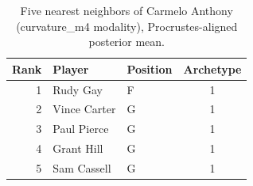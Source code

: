 \begin{table}[htbp]
  \centering\small
  \begin{tabular}{rllc}
    \toprule
    Rank & Player & Position & Archetype \\
    \midrule
    1 & Rudy Gay & F & 1 \\
    2 & Vince Carter & G & 1 \\
    3 & Paul Pierce & G & 1 \\
    4 & Grant Hill & G & 1 \\
    5 & Sam Cassell & G & 1 \\
    \bottomrule
  \end{tabular}
  \caption{Five nearest neighbors of Carmelo Anthony (curvature_m4 modality), Procrustes-aligned posterior mean.}
  \label{tab:Carmelo_Anthony_neighbors_curvature_m4}
\end{table}

